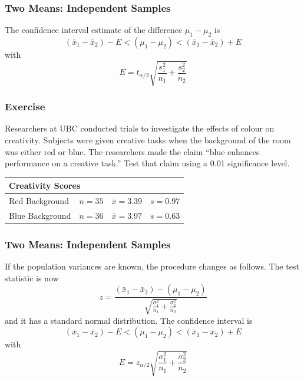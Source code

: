 \documentclass[xcolor=dvipsnames]{beamer}
\begin{document}
\begin{frame}
  \frametitle{Two Means: Independent Samples}
The confidence interval estimate of the difference
$\mu_{1}-\mu_{2}$ is
\begin{equation}
  \label{eq:xohkahbu}
  (\bar{x}_{1}-\bar{x}_{2})-E<(\mu_{1}-\mu_{2})<(\bar{x}_{1}-\bar{x}_{2})+E
\end{equation}
with
\begin{equation}
  \label{eq:oobidiex}
  E=t_{\alpha/2}\sqrt{\frac{s_{1}^{2}}{n_{1}}+\frac{s_{2}^{2}}{n_{2}}}
\end{equation}
\end{frame}

\begin{frame}
  \frametitle{Exercise}
  {\ubung} Researchers at UBC conducted trials to investigate the
  effects of colour on creativity. Subjects were given creative
  tasks when the background of the room was either red or blue.
  The researchers made the claim ``blue enhances performance on a
  creative task.'' Test that claim using a 0.01 significance
  level.

\bigskip

  \begin{tabular}{|l|c|c|c|}\hline
    \multicolumn{4}{|l|}{Creativity Scores} \\ \hline
    Red Background    & $n=35$ & $\bar{x}=3.39$ & $s=0.97$ \\ \hline
    Blue Background   & $n=36$ & $\bar{x}=3.97$ & $s=0.63$ \\ \hline
  \end{tabular}
\end{frame}

\begin{frame}
  \frametitle{Two Means: Independent Samples}
  If the population variances are known, the procedure changes as follows. The test statistic is now
  \begin{equation}
    \label{eq:uazohkeu}
    z=\frac{(\bar{x}_{1}-\bar{x}_{2})-(\mu_{1}-\mu_{2})}{\sqrt{\frac{\sigma_{1}^{2}}{n_{1}}+\frac{\sigma_{2}^{2}}{n_{2}}}}
  \end{equation}
and it has a standard normal distribution. The confidence interval is
\begin{equation}
  \label{eq:oidohgoe}
  (\bar{x}_{1}-\bar{x}_{2})-E<(\mu_{1}-\mu_{2})<(\bar{x}_{1}-\bar{x}_{2})+E
\end{equation}
with
\begin{equation}
  \label{eq:quohthai}
  E=z_{\alpha/2}\sqrt{\frac{\sigma_{1}^{2}}{n_{1}}+\frac{\sigma_{2}^{2}}{n_{2}}}
\end{equation}
\end{frame}
\end{document}
